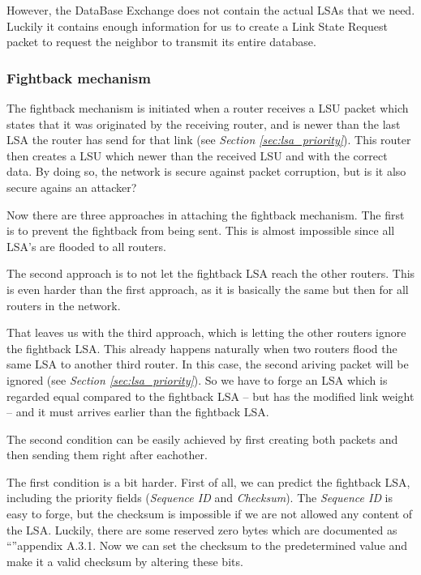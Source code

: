 \documentclass[11pt,a4paper,oneside]{article}
\newcommand{\lsubsubsection}[2]{\subsubsection{#1}\label{sec:#2}}
\begin{document}
    However, the DataBase Exchange does not contain the actual LSAs that we need.
    Luckily it contains enough information for us to create a Link State Request packet to request the neighbor to transmit its entire database.

    \lsubsubsection{Fightback mechanism}{fightback}
    The fightback mechanism is initiated when a router receives a LSU packet which states that it was originated by the receiving router, and is newer than the last LSA the router has send for that link (see \textit{Section \ref{sec:lsa_priority}}). This router then creates a LSU which newer than the received LSU and with the correct data. By doing so, the network is secure against packet corruption, but is it also secure agains an attacker?

    Now there are three approaches in attaching the fightback mechanism. The first is to prevent the fightback from being sent. This is almost impossible since all LSA's are flooded to all routers.

    The second approach is to not let the fightback LSA reach the other routers. This is even harder than the first approach, as it is basically the same but then for all routers in the network.

    That leaves us with the third approach, which is letting the other routers ignore the fightback LSA. This already happens naturally when two routers flood the same LSA to another third router. In this case, the second ariving packet will be ignored (see \textit{Section \ref{sec:lsa_priority}}). So we have to forge an LSA which is regarded equal compared to the fightback LSA -- but has the modified link weight -- and it must arrives earlier than the fightback LSA.

    The second condition can be easily achieved by first creating both packets and then sending them right after eachother.

    The first condition is a bit harder. First of all, we can predict the fightback LSA, including the priority fields (\textit{Sequence ID} and \textit{Checksum}). The \textit{Sequence ID} is easy to forge, but the checksum is impossible if we are not allowed any content of the LSA. Luckily, there are some reserved zero bytes which are documented as \\``''\cite{rfc-5340}{appendix A.3.1}. Now we can set the checksum to the predetermined value and make it a valid checksum by altering these bits.
\end{document}
